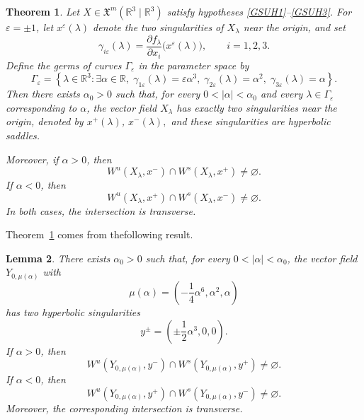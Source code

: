 \documentclass[12pt]{article}
\newtheorem{theorem}{Theorem}[section]
\newtheorem{lemma}[theorem]{Lemma}
\newtheorem{remark definition}{Remark Definition}[section]
\begin{document}
\begin{theorem}\label{Theo2_GPU}
	Let $X\in \mathfrak{X}^{m}(\mathbb{R}^{3}\mid \mathbb{R}^{3})$
	satisfy hypotheses \eqref{GSUH1}--\eqref{GSUH3}. For
	$\varepsilon=\pm 1$, let $x^\varepsilon(\lambda)$ denote the two
	singularities of $X_\lambda$ near the origin, and set
	$$
	\gamma_{i\varepsilon}(\lambda)
	=
	\frac{\partial f_\lambda}{\partial x_i}
	\bigl(x^\varepsilon(\lambda)\bigr),
	\qquad i=1,2,3.
	$$
	Define the germs of curves $\Gamma_\varepsilon$ in the parameter space by
	$$
	\Gamma_\varepsilon
	=
	\left\{
	\lambda\in \mathbb{R}^3:
	\exists \alpha\in \mathbb{R},\;
	\gamma_{1\varepsilon}(\lambda)=\varepsilon \alpha^3,\;
	\gamma_{2\varepsilon}(\lambda)=\alpha^2,\;
	\gamma_{3\varepsilon}(\lambda)=\alpha
	\right\}.
	$$
	Then there exists $\alpha_0>0$ such that, for every
	$0<|\alpha|<\alpha_0$ and every $\lambda\in \Gamma_\varepsilon$
	corresponding to $\alpha$, the vector field $X_\lambda$ has exactly two
	singularities near the origin, denoted by
	$x^+(\lambda)$, $x^-(\lambda),$
	and these singularities are hyperbolic saddles.
	
	Moreover, if $\alpha>0$, then
	$$
	W^u(X_\lambda,x^-)
	\cap
	W^s(X_\lambda,x^+)
	\neq \varnothing.
	$$
	If $\alpha<0$, then
	$$
	W^u(X_\lambda,x^+)
	\cap
	W^s(X_\lambda,x^-)
	\neq \varnothing.
	$$
	In both cases, the intersection is transverse.
\end{theorem}
Theorem~\ref{Theo2_GPU} comes from thefollowing result.
\begin{lemma}
	\label{GSUlemHetPrincipal}
	There exists $\alpha_0>0$ such that, for every
	$0<|\alpha|<\alpha_0$, the vector field
	$Y_{0,\mu(\alpha)}$
	with
	$$
	\mu(\alpha)
	=
	\left(
	-\frac14\alpha^6,\alpha^2,\alpha
	\right)
	$$
	has two hyperbolic singularities
	$$
	y^\pm
	=
	\left(
	\pm \frac12\alpha^3,0,0
	\right).
	$$
	If $\alpha>0$, then
	$$
	W^u(Y_{0,\mu(\alpha)},y^-)
	\cap
	W^s(Y_{0,\mu(\alpha)},y^+)
	\neq \varnothing.
	$$
	If $\alpha<0$, then
	$$
	W^u(Y_{0,\mu(\alpha)},y^+)
	\cap
	W^s(Y_{0,\mu(\alpha)},y^-)
	\neq \varnothing.
	$$
	Moreover, the corresponding intersection is transverse.
\end{lemma}
\end{document}
